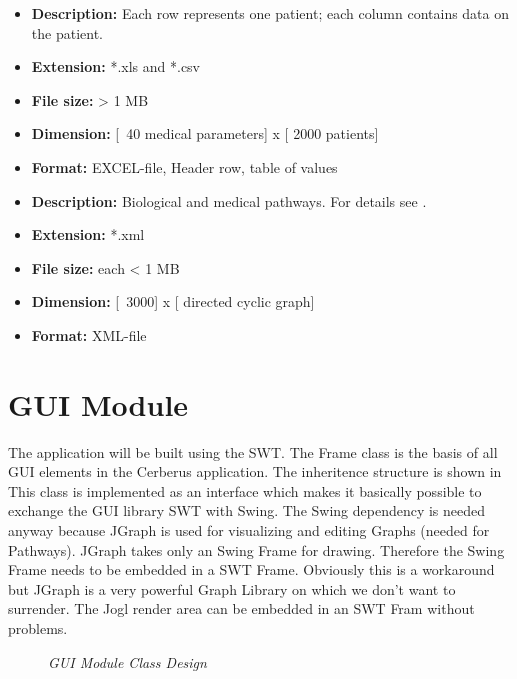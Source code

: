 
\begin{itemize}
\item \textbf{Description: } Each row represents one patient; each column contains data on the patient.
\item \textbf{Extension: } *.xls  and  *.csv
\item \textbf{File size: } > 1 MB
\item \textbf{Dimension: } [~40 medical parameters] x [ 2000 patients]
\item \textbf{Format: } EXCEL-file, Header row, table of values
\end{itemize}


\begin{itemize}
\item \textbf{Description: } Biological and medical pathways. For details see .
\item \textbf{Extension: } *.xml
\item \textbf{File size: } each < 1 MB
\item \textbf{Dimension: } [~3000] x [ directed cyclic graph]
\item \textbf{Format: } XML-file
\end{itemize}

\section{GUI Module}

The application will be built using the SWT. 
The Frame class is the basis of all GUI elements in the Cerberus application.
The inheritence structure is shown in  
This class is implemented as an interface which makes it basically possible to exchange the GUI library SWT with Swing.
The Swing dependency is needed anyway because JGraph is used for visualizing and editing Graphs (needed for Pathways).
JGraph takes only an Swing Frame for drawing. Therefore the Swing Frame needs to be embedded in a SWT Frame.
Obviously this is a workaround but JGraph is a very powerful Graph Library on which we don't want to surrender.
The Jogl render area can be embedded in an SWT Fram without problems.

\begin{figure}[ht]
\centering
{} 
\caption[GUI Module Class Design]{\textit{GUI Module Class Design}} 
\label{gfx:gui_module_class_design}
\end{figure}

